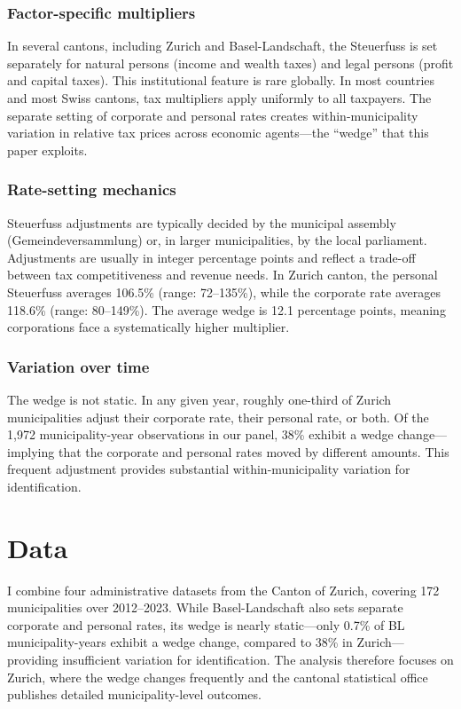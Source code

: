 \documentclass[12pt]{article}
\begin{document}
\subsubsection*{Factor-specific multipliers} In several cantons, including Zurich and Basel-Landschaft, the Steuerfuss is set separately for natural persons (income and wealth taxes) and legal persons (profit and capital taxes). This institutional feature is rare globally. In most countries and most Swiss cantons, tax multipliers apply uniformly to all taxpayers. The separate setting of corporate and personal rates creates within-municipality variation in relative tax prices across economic agents---the ``wedge'' that this paper exploits.

\subsubsection*{Rate-setting mechanics} Steuerfuss adjustments are typically decided by the municipal assembly (Gemeindeversammlung) or, in larger municipalities, by the local parliament. Adjustments are usually in integer percentage points and reflect a trade-off between tax competitiveness and revenue needs. In Zurich canton, the personal Steuerfuss averages 106.5\% (range: 72--135\%), while the corporate rate averages 118.6\% (range: 80--149\%). The average wedge is 12.1 percentage points, meaning corporations face a systematically higher multiplier.

\subsubsection*{Variation over time} The wedge is not static. In any given year, roughly one-third of Zurich municipalities adjust their corporate rate, their personal rate, or both. Of the 1,972 municipality-year observations in our panel, 38\% exhibit a wedge change---implying that the corporate and personal rates moved by different amounts. This frequent adjustment provides substantial within-municipality variation for identification.


\section{Data}

I combine four administrative datasets from the Canton of Zurich, covering 172 municipalities over 2012--2023. While Basel-Landschaft also sets separate corporate and personal rates, its wedge is nearly static---only 0.7\% of BL municipality-years exhibit a wedge change, compared to 38\% in Zurich---providing insufficient variation for identification. The analysis therefore focuses on Zurich, where the wedge changes frequently and the cantonal statistical office publishes detailed municipality-level outcomes.
\end{document}
